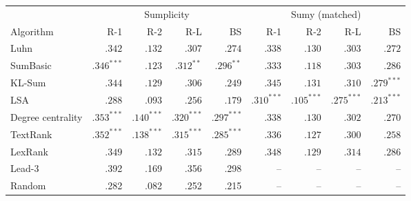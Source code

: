 \begin{tabular}{l r r r r r r r r}
\toprule
 & \multicolumn{4}{c}{Sumplicity} & \multicolumn{4}{c}{Sumy (matched)} \\
\cmidrule(lr){2-5}\cmidrule(lr){6-9}
Algorithm & R-1 & R-2 & R-L & BS & R-1 & R-2 & R-L & BS \\
\midrule
Luhn & $.342$ & $.132$ & $.307$ & $.274$ & $.338$ & $.130$ & $.303$ & $.272$ \\
SumBasic & $\mathbf{.346}^{***}$ & $.123$ & $\mathbf{.312}^{**}$ & $\mathbf{.296}^{**}$ & $.333$ & $.118$ & $.303$ & $.286$ \\
KL-Sum & $.344$ & $.129$ & $.306$ & $.249$ & $.345$ & $.131$ & $.310$ & $\mathbf{.279}^{***}$ \\
LSA & $.288$ & $.093$ & $.256$ & $.179$ & $\mathbf{.310}^{***}$ & $\mathbf{.105}^{***}$ & $\mathbf{.275}^{***}$ & $\mathbf{.213}^{***}$ \\
Degree centrality & $\mathbf{.353}^{***}$ & $\mathbf{.140}^{***}$ & $\mathbf{.320}^{***}$ & $\mathbf{.297}^{***}$ & $.338$ & $.130$ & $.302$ & $.270$ \\
TextRank & $\mathbf{.352}^{***}$ & $\mathbf{.138}^{***}$ & $\mathbf{.315}^{***}$ & $\mathbf{.285}^{***}$ & $.336$ & $.127$ & $.300$ & $.258$ \\
LexRank & $.349$ & $.132$ & $.315$ & $.289$ & $.348$ & $.129$ & $.314$ & $.286$ \\
\midrule
Lead-3 & .392 & .169 & .356 & .298 & -- & -- & -- & -- \\
Random & .282 & .082 & .252 & .215 & -- & -- & -- & -- \\
\bottomrule
\end{tabular}

